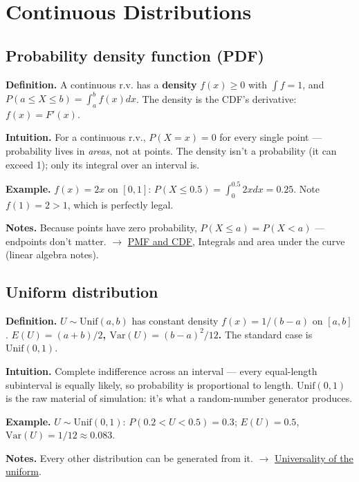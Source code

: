 \documentclass[11pt,a4paper]{article}
\begin{document}
\section{Continuous Distributions}

\subsection{Probability density function (PDF)}\label{sec:probability-density-function-pdf}

\textbf{Definition.} A continuous r.v. has a \textbf{density} $f(x) \geq  0$ with $\int f = 1$, and $P(a \leq  X \leq  b) = \int _{a}^{b} f(x) dx$. The density is the CDF's derivative: $f(x) = F'(x)$.

\textbf{Intuition.} For a continuous r.v., $P(X = x) = 0$ for every single point --- probability lives in \textit{areas}, not at points. The density isn't a probability (it can exceed 1); only its integral over an interval is.

\textbf{Example.} $f(x) = 2x$ on $[0,1]$: $P(X \leq  0.5) = \int _{0}^{0.5} 2x dx = 0.25$. Note $f(1) = 2 > 1$, which is perfectly legal.

\textbf{Notes.} Because points have zero probability, $P(X \leq  a) = P(X < a)$ --- endpoints don't matter. $\to$ \hyperref[sec:pmf-and-cdf]{PMF and CDF}, Integrals and area under the curve (linear algebra notes).

\subsection{Uniform distribution}\label{sec:uniform-distribution}

\textbf{Definition.} $U \sim \mathrm{Unif}(a, b)$ has constant density $f(x) = 1/(b - a)$ on $[a, b]$. \textbf{$E(U) = (a+b)/2$, $\mathrm{Var}(U) = (b-a)^{2}/12$.} The standard case is $\mathrm{Unif}(0,1)$.

\textbf{Intuition.} Complete indifference across an interval --- every equal-length subinterval is equally likely, so probability is proportional to length. $\mathrm{Unif}(0,1)$ is the raw material of simulation: it's what a random-number generator produces.

\textbf{Example.} $U \sim \mathrm{Unif}(0,1)$: $P(0.2 < U < 0.5) = 0.3$; $E(U) = 0.5$, $\mathrm{Var}(U) = 1/12 \approx  0.083$.

\textbf{Notes.} Every other distribution can be generated from it. $\to$ \hyperref[sec:universality-of-the-uniform]{Universality of the uniform}.
\end{document}
